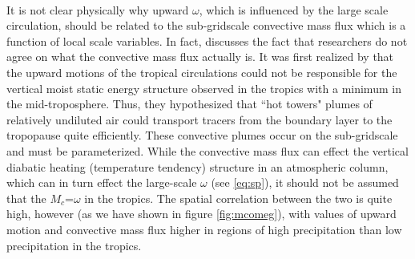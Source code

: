 \documentclass[letterpaper,12pt,titlepage,oneside,final]{book}
\begin{document}
\\
It is not clear physically why upward $\omega$, which is influenced by the large scale circulation, should be related to the sub-gridscale convective mass flux which is a function of local scale variables. In fact, \citep{yano_deep-convective_2009} discusses the fact that researchers do not agree on what the convective mass flux actually is. It was first realized by \citep{riehl_and_malkus_heat_1958} that the upward motions of the tropical circulations could not be responsible for the vertical moist static energy structure observed in the tropics with a minimum in the mid-troposphere. Thus, they hypothesized that ``hot towers" plumes of relatively undiluted air could transport tracers from the boundary layer to the tropopause quite efficiently. These convective plumes occur on the sub-gridscale and must be parameterized. While the convective mass flux can effect the vertical diabatic heating (temperature tendency) structure in an atmospheric column, which can in turn effect the large-scale $\omega$ (see \ref{eq:sp}), it should not be assumed that the $M_{c}$=$\omega$ in the tropics. The spatial correlation between the two is quite high, however (as we have shown in figure \ref{fig:mcomeg}), with values of upward motion and convective mass flux higher in regions of high precipitation than low precipitation in the tropics.
\end{document}
